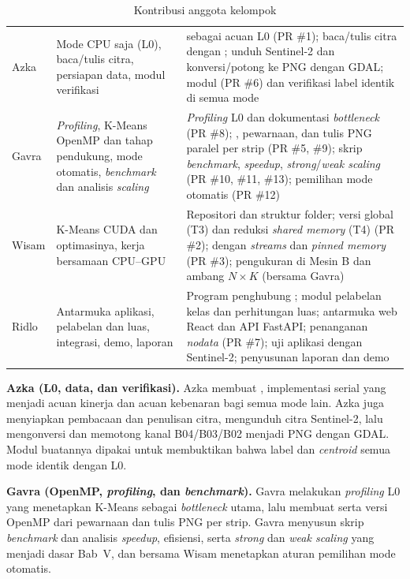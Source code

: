 \begin{table}[H]
\centering
\caption{Kontribusi anggota kelompok}
\label{tab:kontribusi}
\small
\begin{tabularx}{\textwidth}{|L{1.6cm}|L{4.4cm}|Y|}
\hline
{} &  &  \\ \hline
Azka & Mode CPU saja (L0), baca/tulis citra, persiapan data, modul verifikasi &  sebagai acuan L0 (PR \#1); baca/tulis citra dengan ; unduh Sentinel-2 dan konversi/potong ke PNG dengan GDAL; modul  (PR \#6) dan verifikasi label identik di semua mode \\ \hline
Gavra & \emph{Profiling}, K-Means OpenMP dan tahap pendukung, mode otomatis, \emph{benchmark} dan analisis \emph{scaling} & \emph{Profiling} L0 dan dokumentasi \emph{bottleneck} (PR \#8); , pewarnaan, dan tulis PNG paralel per strip (PR \#5, \#9); skrip \emph{benchmark}, \emph{speedup}, \emph{strong}/\emph{weak scaling} (PR \#10, \#11, \#13); pemilihan mode otomatis (PR \#12) \\ \hline
Wisam & K-Means CUDA dan optimasinya, kerja bersamaan CPU--GPU & Repositori dan struktur folder;  versi  global (T3) dan reduksi \emph{shared memory} (T4) (PR \#2);  dengan \emph{streams} dan \emph{pinned memory} (PR \#3); pengukuran di Mesin B dan ambang $N\times K$ (bersama Gavra) \\ \hline
Ridlo & Antarmuka aplikasi, pelabelan dan luas, integrasi, demo, laporan & Program penghubung ; modul pelabelan kelas dan perhitungan luas; antarmuka web React dan API FastAPI; penanganan \emph{nodata} (PR \#7); uji aplikasi dengan Sentinel-2; penyusunan laporan dan demo \\ \hline
\end{tabularx}
\end{table}

\textbf{Azka (L0, data, dan verifikasi).} Azka membuat , implementasi serial yang menjadi acuan kinerja dan acuan kebenaran bagi semua mode lain. Azka juga menyiapkan pembacaan dan penulisan citra, mengunduh citra Sentinel-2, lalu mengonversi dan memotong kanal B04/B03/B02 menjadi PNG dengan GDAL. Modul  buatannya dipakai untuk membuktikan bahwa label dan \emph{centroid} semua mode identik dengan L0.

\textbf{Gavra (OpenMP, \emph{profiling}, dan \emph{benchmark}).} Gavra melakukan \emph{profiling} L0 yang menetapkan K-Means sebagai \emph{bottleneck} utama, lalu membuat  serta versi OpenMP dari pewarnaan dan tulis PNG per strip. Gavra menyusun skrip \emph{benchmark} dan analisis \emph{speedup}, efisiensi, serta \emph{strong} dan \emph{weak scaling} yang menjadi dasar Bab~V, dan bersama Wisam menetapkan aturan pemilihan mode otomatis.

